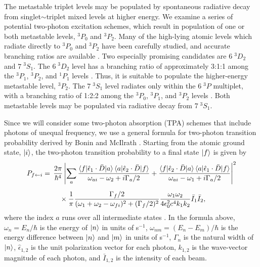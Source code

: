 \documentclass[12pt]{mitthesis}
\begin{document}
The metastable triplet levels may be populated by spontaneous
radiative decay from singlet$\sim$triplet mixed levels at higher
energy.  We examine a series of potential two-photon excitation
schemes, which result in population of one or both metastable levels,
$^3P_0$ and $^3P_2$.  Many of the high-lying atomic levels which
radiate directly to $^3P_0$ and $^3P_2$ have been carefully studied,
and accurate branching ratios are available \cite{benck89}.  Two
especially promising candidates are $6 \; ^3D_2$ and $7 \; ^3S_1$.
The $6 \; ^3D_2$ level has a branching ratio of approximately 3:1:1
among the $^3P_1$, $^3P_2$, and $^1P_1$ levels \cite{benck89}.  Thus,
it is suitable to populate the higher-energy metastable level,
$^3P_2$.  The $7 \; ^3S_1$ level radiates only within the $6 \; ^3P$
multiplet, with a branching ratio of 1:2:2 among the $^3P_0$, $^3P_1$,
and $^3P_2$ levels \cite{benck89}.  Both metastable levels may be
populated via radiative decay from $7 \; ^3S_1$.

Since we will consider some two-photon absorption (TPA) schemes that
include photons of unequal frequency, we use a general formula for
two-photon transition probability derived by Bonin and McIlrath
\cite{bonin84}.  Starting from the atomic ground state, $\mathinner{|{i}\rangle}$, the
two-photon transition probability to a final state $\mathinner{|{f}\rangle}$ is given
by
\begin{equation}
  \label{eq:tpa-prob}
  \begin{split}
    P_{f \leftarrow i} = &\: \: \frac{2 \pi}{\hbar^4}
    \left \lvert
      \sum_a
      \frac{
        \mathinner{\langle{f|\hat{\epsilon}_1 \cdot \bar{D}|a}\rangle}\mathinner{\langle{a|\hat{\epsilon}_2 \cdot \bar{D}|f}\rangle}
      }{
        \omega_{ai} - \omega_2 + i \Gamma_a / 2
      } + \frac{
        \mathinner{\langle{f|\hat{\epsilon}_2 \cdot \bar{D}|a}\rangle}\mathinner{\langle{a|\hat{\epsilon}_1 \cdot \bar{D}|f}\rangle}
      }{
        \omega_{ai} - \omega_1 + i \Gamma_a / 2
      }
    \right \rvert ^2\\[2mm]
    & \: \: \: \: \: \: \times 
      \frac{1}{\pi} 
      \frac{
        \Gamma_f / 2
      }{
        (\omega_1 + \omega_2 - \omega_{fi})^2+(\Gamma_f/2)^2
      } \frac{
        \omega_1 \omega_2
      }{
        4 \epsilon_0^2 c^4 k_1 k_2
      } \bar{I}_1 \bar{I}_2,\\
  \end{split}
\end{equation}
where the index $a$ runs over all intermediate states \cite{bonin84,
  grynberg77}.  In the formula above, $\omega_n = E_n / \hbar$ is the
energy of $\mathinner{|{n}\rangle}$ in units of s$^{-1}$, $\omega_{nm} = (E_n -
E_m)/\hbar$ is the energy difference between $\mathinner{|{n}\rangle}$ and $\mathinner{|{m}\rangle}$
in units of s$^{-1}$, $\Gamma_n$ is the natural width of $\mathinner{|{n}\rangle}$,
$\hat{\epsilon}_{1,2}$ is the unit polarization vector for each
photon, $k_{1,2}$ is the wave-vector magnitude of each photon, and
$\bar{I}_{1,2}$ is the intensity of each beam.
\end{document}
